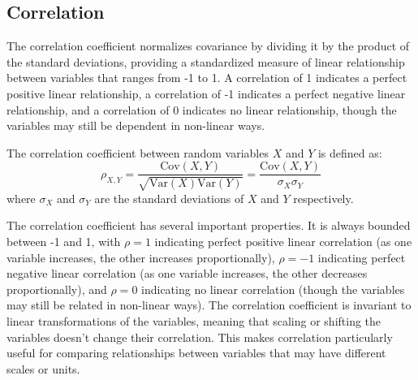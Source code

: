 \subsection{Correlation}

The correlation coefficient normalizes covariance by dividing it by the product of the standard deviations, providing a standardized measure of linear relationship between variables that ranges from -1 to 1. A correlation of 1 indicates a perfect positive linear relationship, a correlation of -1 indicates a perfect negative linear relationship, and a correlation of 0 indicates no linear relationship, though the variables may still be dependent in non-linear ways.

\begin{definition}
The correlation coefficient between random variables $X$ and $Y$ is defined as:
\begin{equation}
\rho_{X,Y} = \frac{\text{Cov}(X,Y)}{\sqrt{\text{Var}(X)\text{Var}(Y)}} = \frac{\text{Cov}(X,Y)}{\sigma_X \sigma_Y}
\end{equation}
where $\sigma_X$ and $\sigma_Y$ are the standard deviations of $X$ and $Y$ respectively.
\end{definition}

The correlation coefficient has several important properties. It is always bounded between -1 and 1, with $\rho = 1$ indicating perfect positive linear correlation (as one variable increases, the other increases proportionally), $\rho = -1$ indicating perfect negative linear correlation (as one variable increases, the other decreases proportionally), and $\rho = 0$ indicating no linear correlation (though the variables may still be related in non-linear ways). The correlation coefficient is invariant to linear transformations of the variables, meaning that scaling or shifting the variables doesn't change their correlation. This makes correlation particularly useful for comparing relationships between variables that may have different scales or units.
